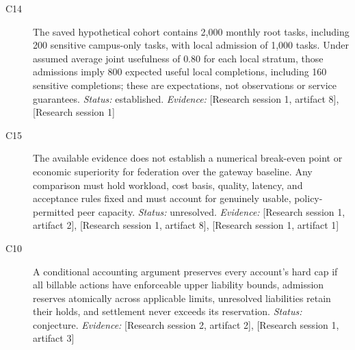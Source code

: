 \documentclass[11pt]{article}
\begin{document}
\begin{sloppypar}
\begin{description}
\item[C14] The saved hypothetical cohort contains 2,000 monthly root tasks, including 200 sensitive campus-only tasks, with local admission of 1,000 tasks. Under assumed average joint usefulness of $0.80$ for each local stratum, those admissions imply 800 expected useful local completions, including 160 sensitive completions; these are expectations, not observations or service guarantees. \textit{Status: }established.
\textit{Evidence: }[Research session 1, artifact 8], [Research session 1]
\item[C15] The available evidence does not establish a numerical break-even point or economic superiority for federation over the gateway baseline. Any comparison must hold workload, cost basis, quality, latency, and acceptance rules fixed and must account for genuinely usable, policy-permitted peer capacity. \textit{Status: }unresolved.
\textit{Evidence: }[Research session 1, artifact 2], [Research session 1, artifact 8], [Research session 1, artifact 1]
\item[C10] A conditional accounting argument preserves every account's hard cap if all billable actions have enforceable upper liability bounds, admission reserves atomically across applicable limits, unresolved liabilities retain their holds, and settlement never exceeds its reservation. \textit{Status: }conjecture.
\textit{Evidence: }[Research session 2, artifact 2], [Research session 1, artifact 3]
\end{description}
\end{sloppypar}
\end{document}
